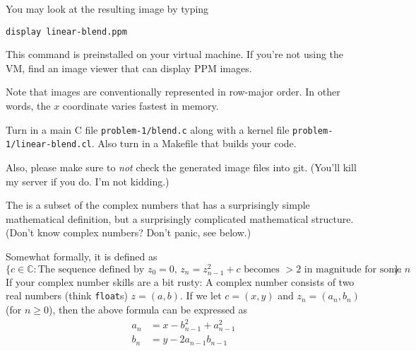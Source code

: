 \documentclass[11pt]{article}
\begin{document}
You may look at the resulting image by typing
\begin{lstlisting}
display linear-blend.ppm
\end{lstlisting}

This command is preinstalled on your virtual machine. If you're not
using the VM, find an image viewer that can display PPM images.

Note that images are conventionally represented in row-major
order. In other words, the $x$ coordinate varies fastest in
memory.

Turn in a main C file \texttt{problem-1/blend.c} along with
a kernel file \texttt{problem-1/linear-blend.cl}. Also turn in
a Makefile that builds your code.

Also, please make sure to \emph{not} check the generated image files
into git. (You'll kill my server if you do. I'm not kidding.)

\bigskip
{}

The  is a subset of the complex numbers that has a surprisingly simple
mathematical definition, but a surprisingly complicated mathematical
structure. (Don't know complex numbers?  Don't panic, see below.)

Somewhat formally, it is defined as
\[
  \{c \in \mathbb C: \text{The sequence defined by $z_0=0$,
  $z_n=z_{n-1}^2 +c$ becomes $> 2$ in magnitude for some $n$}\}.
\]
If your complex number skills are a bit rusty: A complex number
consists of two real numbers (think \texttt{float}s) $z=(a,b)$.
If we let $c=(x,y)$ and $z_n=(a_n,b_n)$ (for $n\ge 0$), then the
above formula can be expressed as
\begin{align*}
  a_n &= x-b_{n-1}^2+a_{n-1}^2\\
  b_n &= y-2a_{n-1}b_{n-1}
\end{align*}
\end{document}

